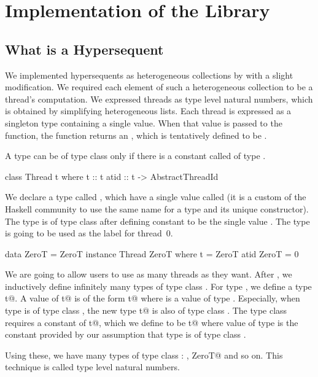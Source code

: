 \section{Implementation of the Library}

\subsection{What is a Hypersequent}
We implemented hypersequents as heterogeneous collections by \citet{hetero}
with a slight modification.  We required each element of such a
heterogeneous collection to be a thread's computation.
We expressed threads as type level natural numbers, which is obtained by
simplifying heterogeneous lists.
Each thread is expressed as a singleton type containing a single value.
When that value is passed to the \verb@atid@ function, the function returns
an \verb@AbstractThreadId@, which is tentatively defined to be
\verb@Int@.

A type \verb@t@ can be of type class \verb@Thread@ only if
there is a constant called \verb@t@ of type \verb@t@.
\begin{code}
class Thread t where
    t :: t
    atid :: t -> AbstractThreadId
\end{code}
We declare a type called \verb@ZeroT@, which have a single value called
\verb@ZeroT@ (it is a custom of the Haskell community to use the same name
for a type and its unique constructor).
The type \verb@ZeroT@ is of type class \verb@Thread@ after defining
constant \verb@t@ to be the single value \verb@ZeroT@.
The type \verb@ZeroT@ is going to be used as the label for thread~0.
 \begin{code}
data ZeroT = ZeroT
instance Thread ZeroT where
    t = ZeroT
    atid ZeroT = 0
 \end{code}
We are going to allow users to use as many threads as they want.
After \verb@ZeroT@, we inductively define infinitely many types of type
class \verb@Thread@.  For type \verb@t@, we define a type \verb@SucT t@.
A value of \verb@SucT t@ is of the form \verb@SucT t@ where \verb@t@
is a value of type \verb@t@.
Especially, when type \verb@t@ is of type class \verb@Thread@,
the new type \verb@SucT t@ is also of type class \verb@Thread@.
The type class \verb@Thread@ requires a constant \verb@t@ of
\verb@SucT t@,
which we define to be \verb@SucT t@ where value \verb@t@ of type
\verb@t@ is the constant provided by our assumption that type \verb@t@
is of type class \verb@Thread@.
Using these, we have many types of type class \verb@Thread@:
\verb@ZeroT@, \verb@SucT ZeroT@ and so on.
This technique is called type level natural numbers.

